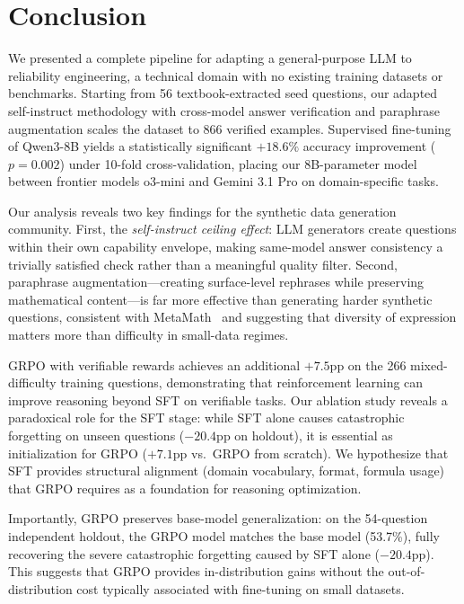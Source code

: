 \section{Conclusion}
\label{sec:conclusion}

We presented a complete pipeline for adapting a general-purpose LLM to reliability engineering, a technical domain with no existing training datasets or benchmarks. Starting from 56 textbook-extracted seed questions, our adapted self-instruct methodology with cross-model answer verification and paraphrase augmentation scales the dataset to 866 verified examples. Supervised fine-tuning of Qwen3-8B yields a statistically significant $+18.6\%$ accuracy improvement ($p=0.002$) under 10-fold cross-validation, placing our 8B-parameter model between frontier models o3-mini and Gemini 3.1 Pro on domain-specific tasks.

Our analysis reveals two key findings for the synthetic data generation community. First, the \emph{self-instruct ceiling effect}: LLM generators create questions within their own capability envelope, making same-model answer consistency a trivially satisfied check rather than a meaningful quality filter. Second, paraphrase augmentation---creating surface-level rephrases while preserving mathematical content---is far more effective than generating harder synthetic questions, consistent with MetaMath~\cite{yu2024metamath} and suggesting that diversity of expression matters more than difficulty in small-data regimes.

GRPO with verifiable rewards achieves an additional $+7.5$pp on the 266 mixed-difficulty training questions, demonstrating that reinforcement learning can improve reasoning beyond SFT on verifiable tasks. Our ablation study reveals a paradoxical role for the SFT stage: while SFT alone causes catastrophic forgetting on unseen questions ($-20.4$pp on holdout), it is essential as initialization for GRPO ($+7.1$pp vs.\ GRPO from scratch). We hypothesize that SFT provides structural alignment (domain vocabulary, format, formula usage) that GRPO requires as a foundation for reasoning optimization.

Importantly, GRPO preserves base-model generalization: on the 54-question independent holdout, the GRPO model matches the base model (53.7\%), fully recovering the severe catastrophic forgetting caused by SFT alone ($-20.4$pp). This suggests that GRPO provides in-distribution gains without the out-of-distribution cost typically associated with fine-tuning on small datasets.

